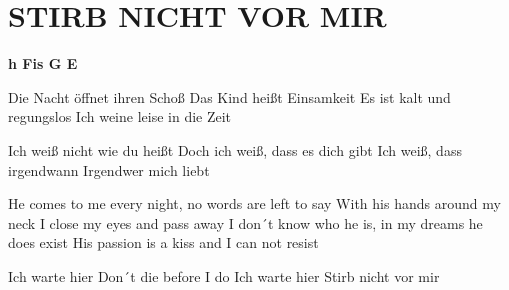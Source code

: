 \documentclass[../../../songbook.tex]{subfiles}
\begin{document}
\TabPositions{8cm} %
\section*{STIRB NICHT VOR MIR}
{}
\vspace{0.1cm}
{\color{red}\textbf{h Fis G E } } \newline

Die Nacht öffnet ihren Schoß		 \newline
Das Kind heißt Einsamkeit			 \newline
Es ist kalt und regungslos			 \newline
Ich weine leise in die Zeit			 \newline

Ich weiß nicht wie du heißt			 \newline
Doch ich weiß, dass es dich gibt	 \newline
Ich weiß, dass irgendwann			 \newline
Irgendwer mich liebt				 \newline

He comes to me every night, no words are left to say			 \newline
With his hands around my neck I close my eyes and pass away		 \newline
I don´t know who he is, in my dreams he does exist				 \newline		
His passion is a kiss and I can not resist						 \newline

\-\hspace{1cm} Ich warte hier			 \newline
\-\hspace{1cm} Don´t die before I do	 \newline
\-\hspace{1cm} Ich warte hier			 \newline
\-\hspace{1cm} Stirb nicht vor mir		 \newline
\end{document}
